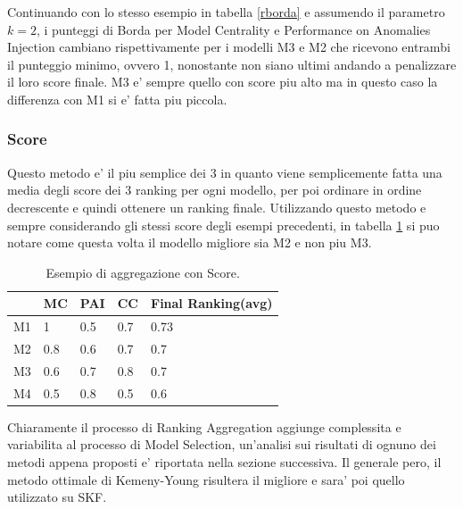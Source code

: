 Continuando con lo stesso esempio in tabella \ref{rborda} e assumendo il parametro \(k=2\), i punteggi di Borda per Model Centrality e Performance on Anomalies Injection cambiano rispettivamente per i modelli M3 e M2 che ricevono entrambi il punteggio minimo, ovvero 1, nonostante non siano ultimi andando a penalizzare il loro score finale. M3 e' sempre quello con score piu alto ma in questo caso la differenza con M1 si e' fatta piu piccola.

\subsubsection{Score}
Questo metodo e' il piu semplice dei 3 in quanto viene semplicemente fatta una media degli score dei 3 ranking per ogni modello, per poi ordinare in ordine decrescente e quindi ottenere un ranking finale.
Utilizzando questo metodo e sempre considerando gli stessi score degli esempi precedenti, in tabella \ref{score} si puo notare come questa volta il modello migliore sia M2 e non piu M3.

\begin{table}
	
	\centering
	\begin{tabular}{|l|l|l|l|l|}
		\hline
		   & MC  & PAI & CC  & Final Ranking(avg) \\ \hline
		M1 & 1   & 0.5 & 0.7 & 0.73               \\ \hline
		M2 & 0.8 & 0.6 & 0.7 & 0.7                \\ \hline
		M3 & 0.6 & 0.7 & 0.8 & 0.7                \\ \hline
		M4 & 0.5 & 0.8 & 0.5 & 0.6                \\ \hline
	\end{tabular}
	\caption{\label{score}Esempio di aggregazione con Score.}
\end{table}



Chiaramente il processo di Ranking Aggregation aggiunge complessita e variabilita al processo di Model Selection, un'analisi sui risultati di ognuno dei metodi appena proposti e' riportata nella sezione successiva. Il generale pero, il metodo ottimale di Kemeny-Young risultera il migliore e sara' poi quello utilizzato su SKF.


